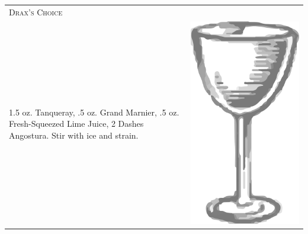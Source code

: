 \documentclass{article}
\begin{document}
\begin{tabular}{p{2in} p{0.5in}}
\multicolumn{2}{p{3in}}{\centering\Huge\textsc{Drax's Choice}}\\ 
  \vspace{-0.1in}1.5 oz. Tanqueray, .5 oz. Grand Marnier, .5 oz. Fresh-Squeezed Lime Juice, 2 Dashes Angostura. Stir with ice and strain. &
  \vspace{-0.1in} \includegraphics{nick_and_nora.png}
\end{tabular}
\end{document}
